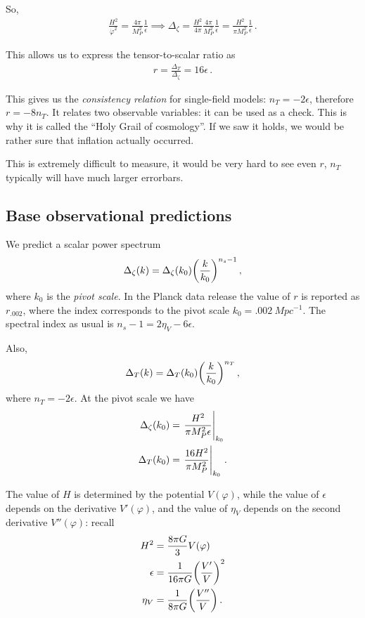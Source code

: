 \documentclass[main.tex]{subfiles}
\begin{document}
So, 
%
\begin{align}
\frac{H^2}{\dot{\varphi}^2} = \frac{4 \pi }{M_P^2} \frac{1}{\epsilon } \implies 
\Delta_\zeta = \frac{H^2}{4 \pi } \frac{4 \pi }{M_P^2} \frac{1}{\epsilon } = \frac{H^2}{\pi M_P^2 } \frac{1}{\epsilon }
\,.
\end{align}

This allows us to express the tensor-to-scalar ratio as 
%
\begin{align}
r =\frac{\Delta _T}{\Delta _\zeta } = 16 \epsilon 
\,. 
\end{align}

This gives us the \emph{consistency relation} for single-field models: \(n_T = - 2 \epsilon\), therefore \(r = - 8 n_T\). 
It relates two observable variables: it can be used as a check. 
This is why it is called the ``Holy Grail of cosmology''. If we saw it holds, we would be rather sure that inflation actually occurred. 

This is extremely difficult to measure, it would be very hard to see even \(r\), \(n_T\) typically will have much larger errorbars. 


\subsection{Base observational predictions}

We predict a scalar power spectrum 
%
\begin{align}
\Delta_{\zeta } (k) = \Delta_\zeta (k_0 ) \qty( \frac{k}{k_0 })^{n_s-1}
\,,
\end{align}
%
where \(k_0 \) is the \emph{pivot scale}. 
In the Planck data release \cite[]{planckcollaborationPlanck2018Results2019} the value of \(r\) is reported as \(r_{\num{.002}}\), where the index corresponds to the pivot scale \(k_0  = \SI{.002}{Mpc^{-1}}\).
The spectral index as usual is \(n_s - 1 = 2 \eta _V - 6\epsilon \). 

Also, 
%
\begin{align}
\Delta _T (k) = \Delta _T (k_0 ) \qty(\frac{k}{k_0 })^{n_T}
\,,
\end{align}
%
where \(n_T = - 2 \epsilon \). 
At the pivot scale we have 
%
\begin{align}
\Delta _\zeta (k_0 ) &= \eval{\frac{H^2}{\pi M_P^2 \epsilon }}_{k_0 }  \\
\Delta _T (k_0 ) &= \eval{\frac{16 H^2}{\pi M_P^2} }_{k_0 }
\,.
\end{align}

The value of \(H\) is determined by the potential \(V(\varphi )\), while the value of \(\epsilon \) depends on the derivative \(V' (\varphi )\), and the value of \(\eta _V\) depends on the second derivative \(V''(\varphi )\): recall 
%
\begin{align}
H^2 &= \frac{8 \pi G}{3} V(\varphi )  \\
\epsilon &= \frac{1}{16 \pi G} \qty(\frac{V'}{V})^2  \\
\eta _V &= \frac{1}{8 \pi G} \qty(\frac{V''}{V})
\,.
\end{align}
%
\end{document}
